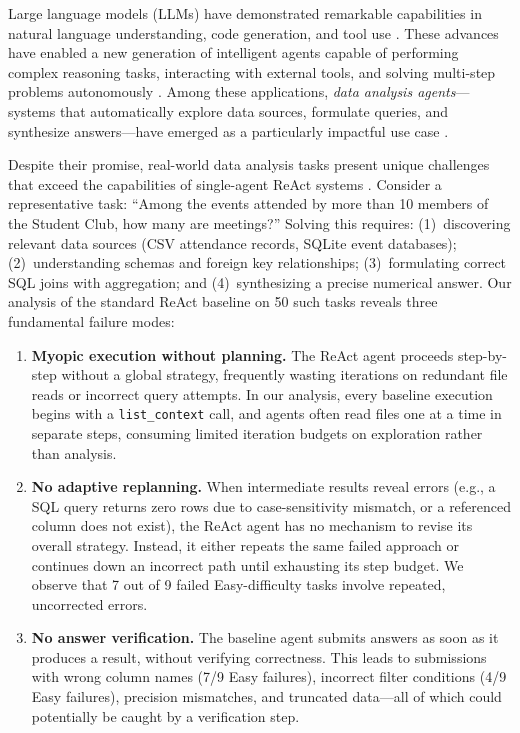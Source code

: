 \documentclass{article}
\begin{document}
Large language models (LLMs) have demonstrated remarkable capabilities in natural language understanding, code generation, and tool use \cite{brown2020language, touvron2023llama, yang2025qwen3}.
These advances have enabled a new generation of intelligent agents capable of performing complex reasoning tasks, interacting with external tools, and solving multi-step problems autonomously \cite{yao2022react, schick2023toolformer}.
Among these applications, \emph{data analysis agents}---systems that automatically explore data sources, formulate queries, and synthesize answers---have emerged as a particularly impactful use case \cite{liu2023agentbench}.

Despite their promise, real-world data analysis tasks present unique challenges that exceed the capabilities of single-agent ReAct systems \cite{yao2022react}.
Consider a representative task: ``Among the events attended by more than 10 members of the Student Club, how many are meetings?''
Solving this requires: (1)~discovering relevant data sources (CSV attendance records, SQLite event databases); (2)~understanding schemas and foreign key relationships; (3)~formulating correct SQL joins with aggregation; and (4)~synthesizing a precise numerical answer.
Our analysis of the standard ReAct baseline on 50 such tasks reveals three fundamental failure modes:

\begin{enumerate}[leftmargin=*, label=\textbf{(\arabic*)}]
    \item \textbf{Myopic execution without planning.}
    The ReAct agent proceeds step-by-step without a global strategy, frequently wasting iterations on redundant file reads or incorrect query attempts.
    In our analysis, every baseline execution begins with a \texttt{list\_context} call, and agents often read files one at a time in separate steps, consuming limited iteration budgets on exploration rather than analysis.

    \item \textbf{No adaptive replanning.}
    When intermediate results reveal errors (e.g., a SQL query returns zero rows due to case-sensitivity mismatch, or a referenced column does not exist), the ReAct agent has no mechanism to revise its overall strategy.
    Instead, it either repeats the same failed approach or continues down an incorrect path until exhausting its step budget.
    We observe that 7 out of 9 failed Easy-difficulty tasks involve repeated, uncorrected errors.

    \item \textbf{No answer verification.}
    The baseline agent submits answers as soon as it produces a result, without verifying correctness.
    This leads to submissions with wrong column names (7/9 Easy failures), incorrect filter conditions (4/9 Easy failures), precision mismatches, and truncated data---all of which could potentially be caught by a verification step.
\end{enumerate}
\end{document}
